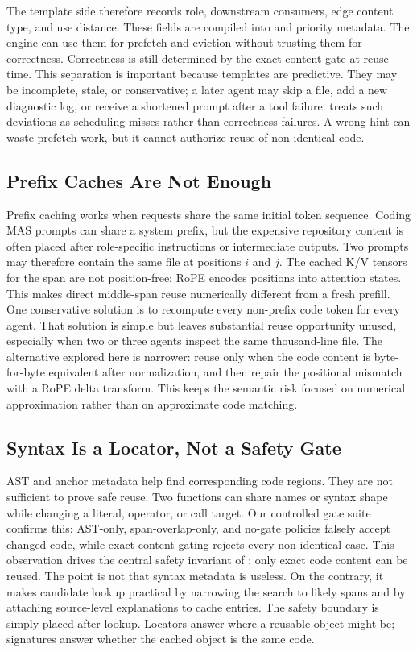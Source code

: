 The template side therefore records role, downstream consumers, edge content type, and use distance.
These fields are compiled into \prefetchhint and priority metadata.
The engine can use them for prefetch and eviction without trusting them for correctness.
Correctness is still determined by the exact content gate at reuse time.
This separation is important because templates are predictive.
They may be incomplete, stale, or conservative; a later agent may skip a file, add a new diagnostic log, or receive a shortened prompt after a tool failure.
\system treats such deviations as scheduling misses rather than correctness failures.
A wrong hint can waste prefetch work, but it cannot authorize reuse of non-identical code.

\subsection{Prefix Caches Are Not Enough}

Prefix caching works when requests share the same initial token sequence.
Coding MAS prompts can share a system prefix, but the expensive repository content is often placed after role-specific instructions or intermediate outputs.
Two prompts may therefore contain the same file at positions $i$ and $j$.
The cached K/V tensors for the span are not position-free: RoPE encodes positions into attention states.
This makes direct middle-span reuse numerically different from a fresh prefill.
One conservative solution is to recompute every non-prefix code token for every agent.
That solution is simple but leaves substantial reuse opportunity unused, especially when two or three agents inspect the same thousand-line file.
The alternative explored here is narrower: reuse only when the code content is byte-for-byte equivalent after normalization, and then repair the positional mismatch with a RoPE delta transform.
This keeps the semantic risk focused on numerical approximation rather than on approximate code matching.

\subsection{Syntax Is a Locator, Not a Safety Gate}

AST and anchor metadata help find corresponding code regions.
They are not sufficient to prove safe reuse.
Two functions can share names or syntax shape while changing a literal, operator, or call target.
Our controlled gate suite confirms this: AST-only, span-overlap-only, and no-gate policies falsely accept changed code, while exact-content gating rejects every non-identical case.
This observation drives the central safety invariant of \system: only exact code content can be reused.
The point is not that syntax metadata is useless.
On the contrary, it makes candidate lookup practical by narrowing the search to likely spans and by attaching source-level explanations to cache entries.
The safety boundary is simply placed after lookup.
Locators answer where a reusable object might be; signatures answer whether the cached object is the same code.

